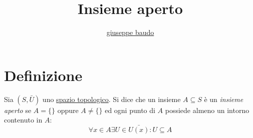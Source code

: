\documentclass[a4paper,10pt]{article}
\title{Insieme aperto}
\author{\href{http://www.baudo.hol.es}{giuseppe baudo}}
\begin{document}
\maketitle

\section*{Definizione}
Sia $(S, \bar{U})$ uno \href{SpazioTopologico.html}{spazio topologico}. Si dice che un insieme $A \subseteq S$ è un \textit{insieme aperto} se $A = \{\}$ oppure $A \ne \{\}$ ed ogni
punto di $A$ possiede almeno un intorno contenuto in $A$:
\[
 \forall x \in A \exists U \in \bar{U(x)} : U \subseteq A
\]
\end{document}
